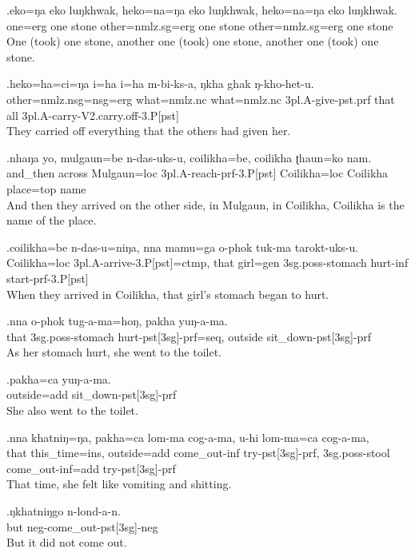 \exg.eko=ŋa eko luŋkhwak, heko=na=ŋa   eko luŋkhwak, heko=na=ŋa   eko luŋkhwak.\\
one{\sc =erg} one stone other{\sc =nmlz.sg=erg} one stone other{\sc =nmlz.sg=erg} one stone\\
One (took) one stone, another one (took) one stone, another one (took) one stone.

\exg.heko=ha=ci=ŋa   i=ha  i=ha  m-bi-ks-a,   ŋkha ghak ŋ-kho-het-u.\\
other{\sc =nmlz.nsg=nsg=erg} what{\sc =nmlz.nc} what{\sc =nmlz.nc} {\sc 3pl.A-}give{\sc -pst.prf} that  all  {\sc 3pl.A-}carry{\sc -V2.carry.off-3.P[pst]}\\
They carried off everything that the others had given her.

\exg.nhaŋa yo, mulgaun=be  n-das-uks-u,   coilikha=be,  coilikha ʈhaun=ko nam.\\
and\_then across Mulgaun{\sc =loc} {\sc 3pl.A-}reach{\sc -prf-3.P[pst]} Coilikha{\sc =loc} Coilikha  place{\sc =top}  name\\
And then they arrived on the other side, in Mulgaun, in Coilikha, Coilikha is the name of the place.

\exg.coilikha=be  n-das-u=niŋa,    nna  mamu=ga  o-phok   tuk-ma tarokt-uks-u.\\
Coilikha{\sc =loc} {\sc 3pl.A-}arrive{\sc -3.P[pst]=ctmp}, that girl{\sc =gen} {\sc 3sg.poss-}stomach hurt{\sc -inf} start{\sc -prf-3.P[pst]}\\
When they arrived in Coilikha, that girl's stomach began to hurt.

\exg.nna  o-phok   tug-a-ma=hoŋ,  pakha yuŋ-a-ma.\\
that {\sc 3sg.poss-}stomach hurt{\sc -pst[3sg]-prf=seq},  outside sit\_down{\sc -pst[3sg]-prf}\\
As her stomach hurt, she went to the toilet.

\exg.pakha=ca  yuŋ-a-ma.\\
outside{\sc =add} sit\_down{\sc -pst[3sg]-prf}\\
She also went to the toilet.

\exg.nna  khatniŋ=ŋa,  pakha=ca  lom-ma cog-a-ma,  u-hi   lom-ma=ca  cog-a-ma,\\
that this\_time{\sc =ins}, outside{\sc =add} come\_out{\sc -inf} try{\sc -pst[3sg]-prf}, {\sc 3sg.poss-}stool come\_out{\sc -inf=add} try{\sc -pst[3sg]-prf}\\
That time, she felt like vomiting and shitting.

\exg.ŋkhatniŋgo  n-lond-a-n.\\
but {\sc neg-}come\_out{\sc -pst[3sg]-neg}\\
But it did not come out.

